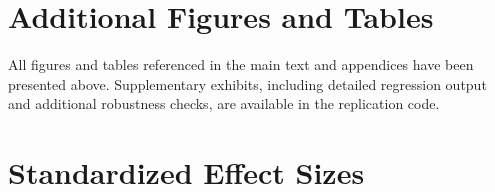 \documentclass[12pt]{article}
\begin{document}
\section{Additional Figures and Tables}
\label{app:additional}

All figures and tables referenced in the main text and appendices have been presented above. Supplementary exhibits, including detailed regression output and additional robustness checks, are available in the replication code.


\section{Standardized Effect Sizes}
\label{sec:sde}


\end{document}

